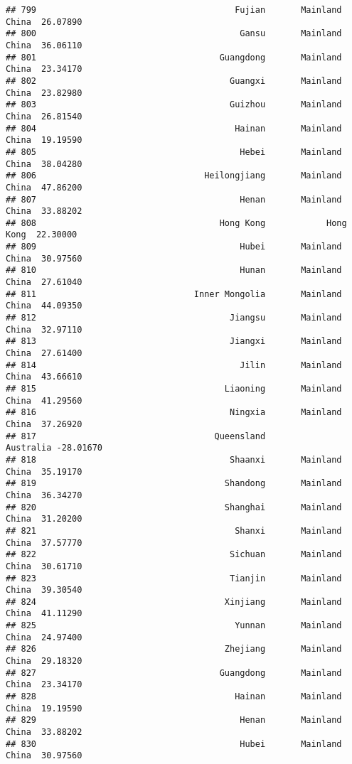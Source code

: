 \documentclass[
]{article}
\begin{document}
\begin{verbatim}
## 799                                       Fujian       Mainland China  26.07890
## 800                                        Gansu       Mainland China  36.06110
## 801                                    Guangdong       Mainland China  23.34170
## 802                                      Guangxi       Mainland China  23.82980
## 803                                      Guizhou       Mainland China  26.81540
## 804                                       Hainan       Mainland China  19.19590
## 805                                        Hebei       Mainland China  38.04280
## 806                                 Heilongjiang       Mainland China  47.86200
## 807                                        Henan       Mainland China  33.88202
## 808                                    Hong Kong            Hong Kong  22.30000
## 809                                        Hubei       Mainland China  30.97560
## 810                                        Hunan       Mainland China  27.61040
## 811                               Inner Mongolia       Mainland China  44.09350
## 812                                      Jiangsu       Mainland China  32.97110
## 813                                      Jiangxi       Mainland China  27.61400
## 814                                        Jilin       Mainland China  43.66610
## 815                                     Liaoning       Mainland China  41.29560
## 816                                      Ningxia       Mainland China  37.26920
## 817                                   Queensland            Australia -28.01670
## 818                                      Shaanxi       Mainland China  35.19170
## 819                                     Shandong       Mainland China  36.34270
## 820                                     Shanghai       Mainland China  31.20200
## 821                                       Shanxi       Mainland China  37.57770
## 822                                      Sichuan       Mainland China  30.61710
## 823                                      Tianjin       Mainland China  39.30540
## 824                                     Xinjiang       Mainland China  41.11290
## 825                                       Yunnan       Mainland China  24.97400
## 826                                     Zhejiang       Mainland China  29.18320
## 827                                    Guangdong       Mainland China  23.34170
## 828                                       Hainan       Mainland China  19.19590
## 829                                        Henan       Mainland China  33.88202
## 830                                        Hubei       Mainland China  30.97560

\end{verbatim}
\end{document}
